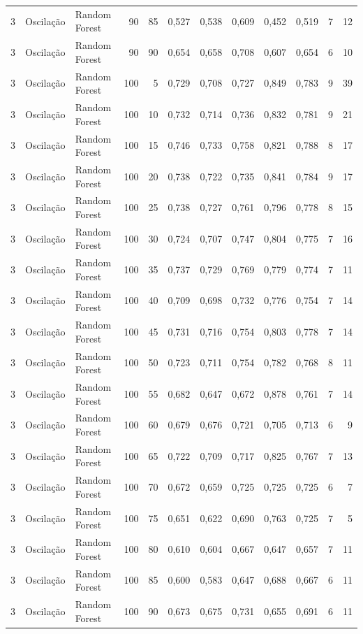 \begin{longtable}{@{}rllrrrrrrrrr@{}}
3 & Oscilação & Random Forest & 90 & 85 & 0,527 & 0,538 & 0,609 & 0,452 & 0,519 & 7 & 12 \\
3 & Oscilação & Random Forest & 90 & 90 & 0,654 & 0,658 & 0,708 & 0,607 & 0,654 & 6 & 10 \\
3 & Oscilação & Random Forest & 100 & 5 & 0,729 & 0,708 & 0,727 & 0,849 & 0,783 & 9 & 39 \\
3 & Oscilação & Random Forest & 100 & 10 & 0,732 & 0,714 & 0,736 & 0,832 & 0,781 & 9 & 21 \\
3 & Oscilação & Random Forest & 100 & 15 & 0,746 & 0,733 & 0,758 & 0,821 & 0,788 & 8 & 17 \\
3 & Oscilação & Random Forest & 100 & 20 & 0,738 & 0,722 & 0,735 & 0,841 & 0,784 & 9 & 17 \\
3 & Oscilação & Random Forest & 100 & 25 & 0,738 & 0,727 & 0,761 & 0,796 & 0,778 & 8 & 15 \\
3 & Oscilação & Random Forest & 100 & 30 & 0,724 & 0,707 & 0,747 & 0,804 & 0,775 & 7 & 16 \\
3 & Oscilação & Random Forest & 100 & 35 & 0,737 & 0,729 & 0,769 & 0,779 & 0,774 & 7 & 11 \\
3 & Oscilação & Random Forest & 100 & 40 & 0,709 & 0,698 & 0,732 & 0,776 & 0,754 & 7 & 14 \\
3 & Oscilação & Random Forest & 100 & 45 & 0,731 & 0,716 & 0,754 & 0,803 & 0,778 & 7 & 14 \\
3 & Oscilação & Random Forest & 100 & 50 & 0,723 & 0,711 & 0,754 & 0,782 & 0,768 & 8 & 11 \\
3 & Oscilação & Random Forest & 100 & 55 & 0,682 & 0,647 & 0,672 & 0,878 & 0,761 & 7 & 14 \\
3 & Oscilação & Random Forest & 100 & 60 & 0,679 & 0,676 & 0,721 & 0,705 & 0,713 & 6 & 9 \\
3 & Oscilação & Random Forest & 100 & 65 & 0,722 & 0,709 & 0,717 & 0,825 & 0,767 & 7 & 13 \\
3 & Oscilação & Random Forest & 100 & 70 & 0,672 & 0,659 & 0,725 & 0,725 & 0,725 & 6 & 7 \\
3 & Oscilação & Random Forest & 100 & 75 & 0,651 & 0,622 & 0,690 & 0,763 & 0,725 & 7 & 5 \\
3 & Oscilação & Random Forest & 100 & 80 & 0,610 & 0,604 & 0,667 & 0,647 & 0,657 & 7 & 11 \\
3 & Oscilação & Random Forest & 100 & 85 & 0,600 & 0,583 & 0,647 & 0,688 & 0,667 & 6 & 11 \\
3 & Oscilação & Random Forest & 100 & 90 & 0,673 & 0,675 & 0,731 & 0,655 & 0,691 & 6 & 11 \\

\end{longtable}
